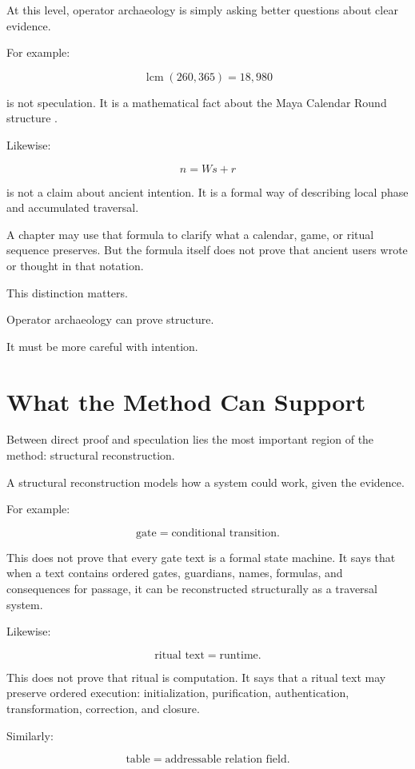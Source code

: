 \documentclass[11pt]{book}
\begin{document}
At this level, operator archaeology is simply asking better questions about clear evidence.

For example:

\[
\operatorname{lcm}(260,365)=18{,}980
\]

is not speculation. It is a mathematical fact about the Maya Calendar Round structure \cite{BrickerBricker2011AstronomyMayaCodices,Thompson1950MayaHieroglyphicWriting,Coe2011Maya}.

Likewise:

\[
n = Ws + r
\]

is not a claim about ancient intention. It is a formal way of describing local phase and accumulated traversal.

A chapter may use that formula to clarify what a calendar, game, or ritual sequence preserves. But the formula itself does not prove that ancient users wrote or thought in that notation.

This distinction matters.

Operator archaeology can prove structure.

It must be more careful with intention.

\section{What the Method Can Support}

Between direct proof and speculation lies the most important region of the method: structural reconstruction.

A structural reconstruction models how a system could work, given the evidence.

For example:

\[
\text{gate} = \text{conditional transition}.
\]

This does not prove that every gate text is a formal state machine. It says that when a text contains ordered gates, guardians, names, formulas, and consequences for passage, it can be reconstructed structurally as a traversal system.

Likewise:

\[
\text{ritual text} = \text{runtime}.
\]

This does not prove that ritual is computation. It says that a ritual text may preserve ordered execution: initialization, purification, authentication, transformation, correction, and closure.

Similarly:

\[
\text{table} = \text{addressable relation field}.
\]
\end{document}
